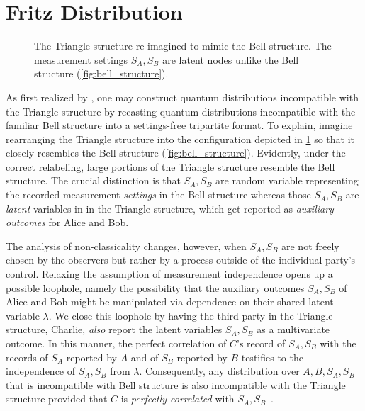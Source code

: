 \documentclass[aps, 10pt, english, twoside, pra, nofootinbib, tightenlines, longbibliography, superscriptaddress]{revtex4-1}
\begin{document}
    \section{Fritz Distribution}
    \label{sec:fritz_distribution}
    \begin{figure}
    \begin{nscenter}
        \scalebox{1.0}{}
        \caption{The Triangle structure re-imagined to mimic the Bell structure. The measurement settings $S_{A},S_{B}$ are latent nodes unlike the Bell structure (\cref{fig:bell_structure}).}
        \label{fig:triangle_structure_with_fritz_bell_embedded}
    \end{nscenter}
    \end{figure}

    As first realized by \citet{Fritz_2012}, one may construct quantum distributions incompatible with the Triangle structure by recasting quantum distributions incompatible with the familiar Bell structure into a settings-free tripartite format. To explain, imagine rearranging the Triangle structure into the configuration depicted in \cref{fig:triangle_structure_with_fritz_bell_embedded} so that it closely resembles the Bell structure (\cref{fig:bell_structure}). Evidently, under the correct relabeling, large portions of the Triangle structure resemble the Bell structure. The crucial distinction is that $S_{A}, S_{B}$ are random variable representing the recorded measurement \emph{settings} in the Bell structure whereas those $S_{A}, S_{B}$ are \emph{latent} variables in in the Triangle structure, which get reported as \textit{auxiliary outcomes} for Alice and Bob.

    The analysis of non-classicality changes, however, when $S_{A}, S_{B}$ are not freely chosen by the observers but rather by a process outside of the individual party's control. Relaxing the assumption of measurement independence opens up a possible loophole, namely the possibility that the auxiliary outcomes $S_{A}, S_{B}$ of Alice and Bob might be manipulated via dependence on their shared latent variable $\lambda$. We close this loophole by having the third party in the Triangle structure, Charlie, \emph{also} report the latent variables $S_{A}, S_{B}$ as a multivariate outcome. In this manner, the perfect correlation of $C$'s record of $S_{A}, S_{B}$ with the records of $S_{A}$ reported by $A$ and of $S_{B}$ reported by $B$ testifies to the independence of $S_{A}, S_{B}$ from $\lambda$. Consequently, any distribution over $A, B, S_{A}, S_{B}$ that is incompatible with Bell structure is also incompatible with the Triangle structure provided that $C$ is \textit{perfectly correlated} with $S_{A}, S_{B}$~\cite{Fritz_2012}.
\end{document}
